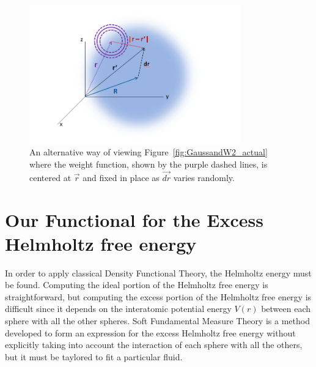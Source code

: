 \documentclass[double,12pt]{beavtex}
\begin{document}
 \begin{figure}[h!]
    \centering
    \includegraphics[height=6cm]{GaussandW2_thinkas.png}
    \caption{An alternative way of viewing Figure~\ref{fig:GaussandW2_actual} where 
    the weight function, shown by the purple dashed lines, is centered at $\vec{r}$  
    and fixed in place as $\vec{dr}$ varies randomly.} 
  \label{fig:GaussandW2_thinkas}
  \end{figure} 


\section{Our Functional for the Excess Helmholtz free energy}
In order to apply classical Density Functional Theory, the Helmholtz energy
must be found. Computing the ideal portion of the Helmholtz free energy is
straightforward, but computing the excess portion of the Helmholtz free energy 
is difficult since it depends on the interatomic potential energy $V(r)$ between 
each sphere with all the other spheres. Soft Fundamental Measure Theory is a method
developed to form an expression for the excess Helmholtz free energy without
explicitly taking into account the interaction of each sphere with all the others, 
but it must be taylored to fit a particular fluid\cite{schmidt1999density}. 
\end{document}
